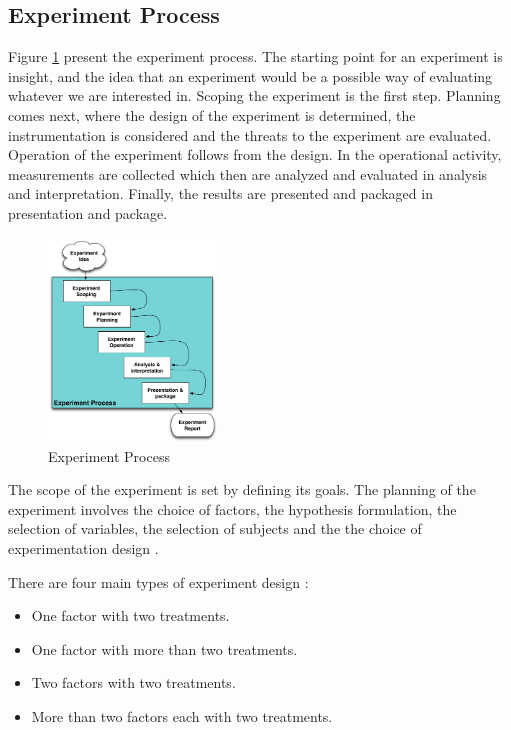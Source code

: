 \subsection{Experiment Process}

Figure \ref{fig:experimentprocess} present the experiment process. The starting point for an experiment is insight, and the idea that an experiment would be a possible way of evaluating whatever we are interested in.  Scoping the experiment is the first step. Planning comes next, where the design of the experiment is determined, the instrumentation is considered and the threats to the experiment are evaluated. Operation of the experiment follows from the design. In the operational activity, measurements are collected which then are analyzed and evaluated in analysis and interpretation. Finally, the results are presented and packaged in presentation and package.

\begin{figure}[h]
\center
\includegraphics[width=0.4\textwidth]{./images/experimentprocess.png}
\caption{Experiment Process}
\label{fig:experimentprocess}
\end{figure}


The scope of the experiment is set by defining its goals. The planning of the experiment involves the choice of factors, the hypothesis formulation, the selection of variables, the selection of subjects and the the choice of experimentation design \cite{montgomery2008design} \cite{Wohlin2013}.


There are four main types of experiment design \cite{montgomery2008design}:

\begin{itemize}
\item One factor with two treatments. 
\item One factor with more than two treatments. 
\item Two factors with two treatments. 
\item More than two factors each with two treatments.
\end{itemize}


